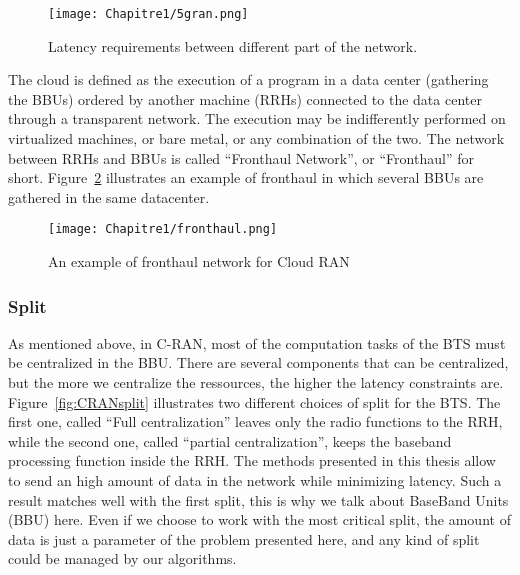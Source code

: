  \begin{figure}[h]
      \begin{center}
      \texttt{[image: Chapitre1/5gran.png]}
      \end{center}
      \caption{Latency requirements between different part of the network.}\label{fig:5gran}
      \end{figure}

The cloud is defined as the execution of a program in a data center (gathering the BBUs) ordered by another machine (RRHs) connected to the data center through a transparent network.
 The execution may be indifferently performed on virtualized machines, or bare metal, or any combination of the two. The network between RRHs and BBUs is called “Fronthaul Network”, or “Fronthaul” for short. Figure~\ref{fig:fronthaul} illustrates an example of fronthaul in which several BBUs are gathered in the same datacenter. 

  \begin{figure}[h]
      \begin{center}
      \texttt{[image: Chapitre1/fronthaul.png]}
      \end{center}
      \caption{An example of fronthaul network for Cloud RAN}\label{fig:fronthaul}
      \end{figure}
      
      \subsubsection{Split}

      As mentioned above, in C-RAN, most of the computation tasks of the BTS must be centralized in the BBU. There are several components that can be centralized, but the more we centralize the ressources, the higher the latency constraints are.
      Figure~\ref{fig:CRANsplit} illustrates two different choices of split for the BTS. The first one, called ``Full centralization'' leaves only the radio functions to the RRH, while the second one, called ``partial centralization'', keeps the baseband processing function inside the RRH. The methods presented in this thesis allow to send an high amount of data in the network while minimizing latency. Such a result matches well with the first split, this is why we talk about BaseBand Units (BBU) here. Even if we choose to work with the most critical split, the amount of data is just a parameter of the problem presented here, and any kind of split could be managed by our algorithms.
      
